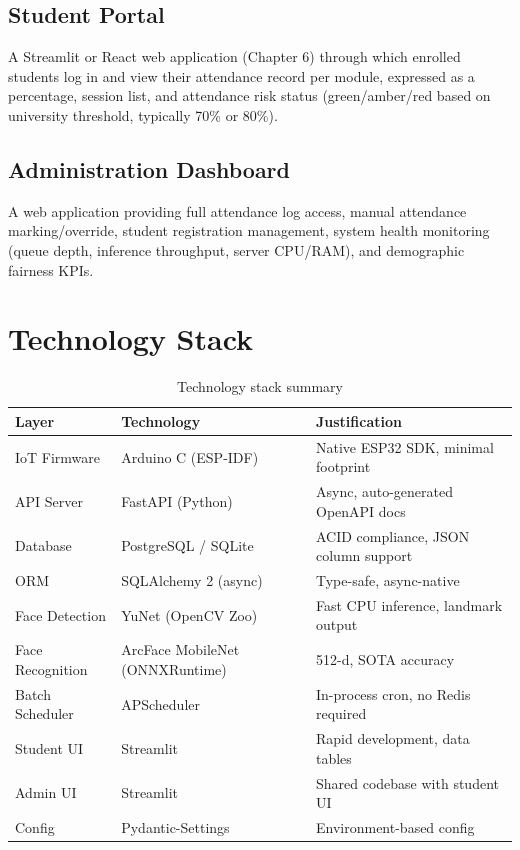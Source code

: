 \documentclass[12pt,a4paper]{report}
\begin{document}
\subsection{Student Portal}
A Streamlit or React web application (Chapter 6) through which enrolled students log in and view their attendance record per module, expressed as a percentage, session list, and attendance risk status (green/amber/red based on university threshold, typically 70\% or 80\%).

\subsection{Administration Dashboard}
A web application providing full attendance log access, manual attendance marking/override, student registration management, system health monitoring (queue depth, inference throughput, server CPU/RAM), and demographic fairness KPIs.

\section{Technology Stack}

\begin{table}[H]
\centering
\caption{Technology stack summary}
\label{tab:tech_stack}
\begin{tabularx}{\linewidth}{llX}
\toprule
\textbf{Layer} & \textbf{Technology} & \textbf{Justification} \\
\midrule
IoT Firmware   & Arduino C (ESP-IDF) & Native ESP32 SDK, minimal footprint \\
API Server     & FastAPI (Python)     & Async, auto-generated OpenAPI docs \\
Database       & PostgreSQL / SQLite  & ACID compliance, JSON column support \\
ORM            & SQLAlchemy 2 (async) & Type-safe, async-native \\
Face Detection & YuNet (OpenCV Zoo)   & Fast CPU inference, landmark output \\
Face Recognition & ArcFace MobileNet (ONNXRuntime) & 512-d, SOTA accuracy \\
Batch Scheduler & APScheduler         & In-process cron, no Redis required \\
Student UI     & Streamlit            & Rapid development, data tables \\
Admin UI       & Streamlit            & Shared codebase with student UI \\
Config         & Pydantic-Settings    & Environment-based config \\
\bottomrule
\end{tabularx}
\end{table}
\end{document}
